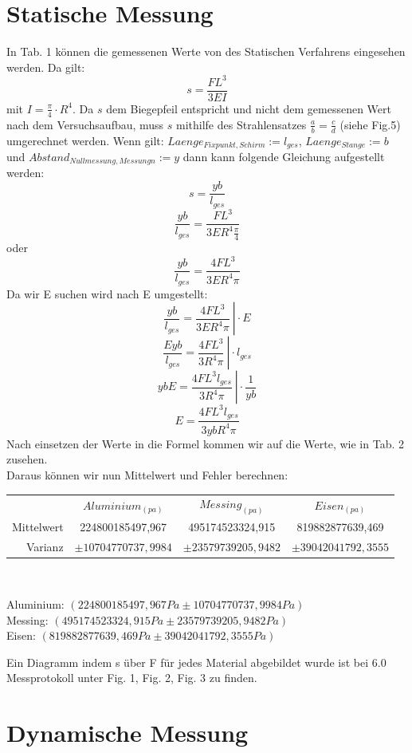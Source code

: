 \documentclass[11pt, a4paper]{article}
\begin{document}
\section{Statische Messung}

In Tab. 1 können die gemessenen Werte von des Statischen Verfahrens eingesehen werden. Da gilt: $$s=\frac{FL^3}{3EI}$$ mit $I=\frac{\pi}{4}\cdot R^4$. Da $s$ dem Biegepfeil entspricht und nicht dem gemessenen Wert nach dem Versuchsaufbau, muss $s$ mithilfe des Strahlensatzes $\frac{a}{b}=\frac{c}{d}$ (siehe Fig.5) umgerechnet werden. Wenn gilt: $Laenge_{Fixpunkt,Schirm} := l_{ges}$, $Laenge_{Stange} := b$ und $Abstand_{Nullmessung, Messung n} := y$ dann kann folgende Gleichung aufgestellt werden: $$s=\frac{yb}{l_{ges}}$$ $$\frac{yb}{l_{ges}}=\frac{FL^3}{3ER^4\frac{\pi}{4}}$$ oder $$\frac{yb}{l_{ges}}=\frac{4FL^3}{3ER^4\pi}$$ Da wir E suchen wird nach E umgestellt: $$\left.\frac{yb}{l_{ges}}=\frac{4FL^3}{3ER^4\pi}\ \right|\cdot E$$ $$\left.\frac{Eyb}{l_{ges}}=\frac{4FL^3}{3R^4\pi}\ \right| \cdot l_{ges}$$ $$\left. ybE=\frac{4FL^3l_{ges}}{3R^4\pi}\ \right| \cdot \frac{1}{yb}$$ $$E=\frac{4FL^3l_{ges}}{3ybR^4\pi}$$ Nach einsetzen der Werte in die Formel kommen wir auf die Werte, wie in Tab. 2 zusehen.\\
Daraus können wir nun Mittelwert und Fehler berechnen:\\

\begin{tabular}{r|ccc}
 & $Aluminium_{(pa)}$ & $Messing_{(pa)}$ & $Eisen_{(pa)}$\\
Mittelwert & 224800185497,967	& 495174523324,915	& 819882877639,469\\
Varianz & $\pm 10704770737,9984$	 & $\pm 23579739205,9482$	& $\pm 39042041792,3555$\\
\end{tabular}\\
\begin{flushleft}
Aluminium: $(224800185497,967Pa \pm 10704770737,9984Pa)$\\
Messing: $(495174523324,915Pa \pm 23579739205,9482Pa)$\\
Eisen: $( 819882877639,469Pa \pm 39042041792,3555Pa)$\\
\end{flushleft}
Ein Diagramm indem s über F für jedes Material abgebildet wurde ist bei 6.0 Messprotokoll unter Fig. 1, Fig. 2, Fig. 3 zu finden. 

\newpage
\section{Dynamische Messung}
\end{document}
